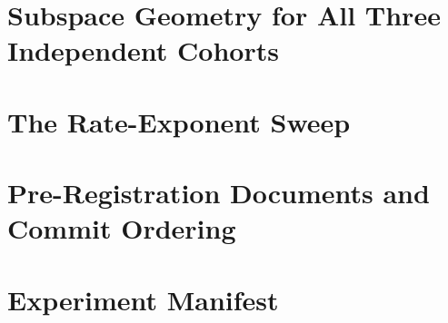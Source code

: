 \section{Subspace Geometry for All Three Independent Cohorts}\label{app:geometry}


\section{The Rate-Exponent Sweep}\label{app:rate}


\section{Pre-Registration Documents and Commit Ordering}\label{app:prereg}



\section{Experiment Manifest}\label{app:manifest}

